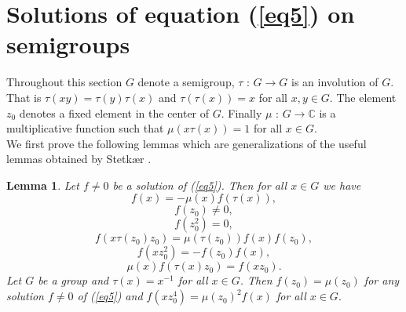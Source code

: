 \documentclass[12pt]{amsart}
\newtheorem{lem}[thm]{Lemma}
\theoremstyle{definition}
\theoremstyle{remark}
\numberwithin{equation}{section}
\begin{document}
\section{Solutions of equation (\ref{eq5}) on semigroups}
Throughout this section $G$ denote a semigroup, $\tau$ :
$G\longrightarrow G$ is an involution of $G$. That is
$\tau(xy)=\tau(y)\tau(x)$ and $\tau(\tau(x))=x$ for all $x,y\in G$.
The element $z_0$ denotes a fixed element in the center of $G$.
Finally $\mu$ : $G\longrightarrow \mathbb{C}$ is a multiplicative
function such that $\mu(x\tau(x))=1$ for all $x\in G$. \\We first
prove the following lemmas which are generalizations of the useful
lemmas obtained by Stetk\ae r \cite{St3}.
\begin{lem} Let $f \neq 0$ be a solution of (\ref{eq5}). Then for
all $x\in G$ we have
\begin{equation}\label{eq7}
    f(x)=-\mu(x)f(\tau(x)),
\end{equation}
\begin{equation}\label{eq8}
    f(z_0)\neq 0,
\end{equation}
\begin{equation}\label{eq9'}
    f(z_{0}^{2})=0,
\end{equation}
\begin{equation}\label{eq9}
    f(x\tau(z_0)z_0)=\mu(\tau(z_0))f(x)f(z_0),
\end{equation}
\begin{equation}\label{eq10}
    f(xz_{0}^{2})=-f(z_0)f(x),
\end{equation}
\begin{equation}\label{eq11}
    \mu(x)f(\tau(x)z_0)=f(xz_0).
\end{equation}Let $G$ be a group and $\tau(x)=x^{-1}$ for all $x\in
G$. Then $f(z_0)=\mu(z_0)$ for any solution $f\neq 0$ of (\ref{eq5})
and  $f(xz_{0}^{4})=\mu(z_0)^{2}f(x)$ for all $x\in G.$
 \end{lem}
\end{document}
